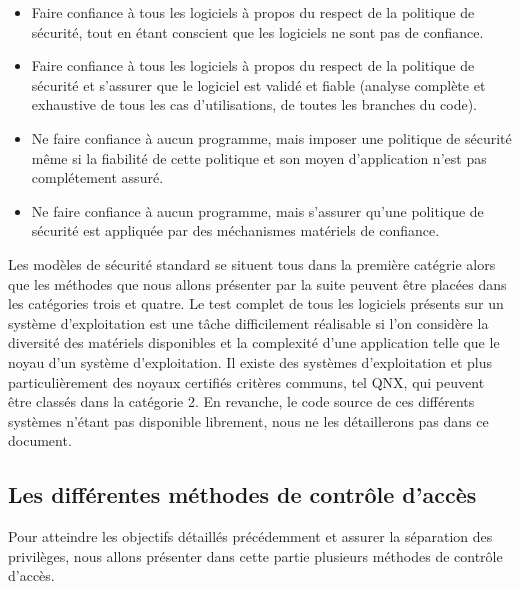 \begin{itemize}
  \item Faire confiance à tous les logiciels à propos du respect de la politique de sécurité, tout en étant conscient que les logiciels ne sont pas de confiance.%
  \item Faire confiance à tous les logiciels à propos du respect de la politique de sécurité et s'assurer que le logiciel est validé et fiable (analyse complète et exhaustive de tous les cas d'utilisations, de toutes les branches du code).%
  \item Ne faire confiance à aucun programme, mais imposer une politique de sécurité même si la fiabilité de cette politique et son moyen d'application n'est pas complétement assuré.%
  \item Ne faire confiance à aucun programme, mais s'assurer qu'une politique de sécurité est appliquée par des méchanismes matériels de confiance.%
\end{itemize}

Les modèles de sécurité standard se situent tous dans la première catégrie alors que les méthodes que nous allons présenter par la suite peuvent être placées dans les catégories trois et quatre. Le test complet de tous les logiciels présents sur un système d'exploitation est une tâche difficilement réalisable si l'on considère la diversité des matériels disponibles et la complexité d'une application telle que le noyau d'un système d'exploitation. Il existe des systèmes d'exploitation et plus particulièrement des noyaux certifiés critères communs, tel QNX\cite{QNX}, qui peuvent être classés dans la catégorie 2. En revanche, le code source de ces différents systèmes n'étant pas disponible librement, nous ne les détaillerons pas dans ce document.

\subsection{Les différentes méthodes de contrôle d'accès}

Pour atteindre les objectifs détaillés précédemment et assurer la séparation des privilèges, nous allons présenter dans cette partie plusieurs méthodes de contrôle d'accès.

